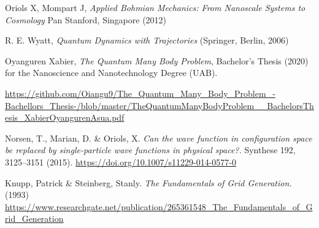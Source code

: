 \documentclass[11pt, a4paper]{article} %
\begin{document}
\begin{thebibliography}{1}

	Oriols X, Mompart J, {\em Applied Bohmian Mechanics: From Nanoscale Systems to Cosmology} Pan Stanford, Singapore (2012)
	

R. E. Wyatt, {\em Quantum Dynamics with Trajectories} (Springer, Berlin, 2006)


	Oyanguren Xabier, {\em The Quantum Many Body Problem}, Bachelor's Thesis (2020) for the Nanoscience and Nanotechnology Degree (UAB).

\href{https://github.com/Oiangu9/The\_Quantum\_Many\_Body\_Problem\_-Bachellors\_Thesis-/blob/master/TheQuantumManyBodyProblem\_\_BachelorsThesis\_XabierOyangurenAsua.pdf}{https://github.com/Oiangu9/The\_Quantum\_Many\_Body\_Problem\_-Bachellors\_Thesis-/blob/master/TheQuantumManyBodyProblem\_\_BachelorsThesis\_XabierOyangurenAsua.pdf}

Norsen, T., Marian, D. \& Oriols, X. {\em Can the wave function in configuration space be replaced by single-particle wave functions in physical space?.} Synthese 192, 3125–3151 (2015). \href{https://doi.org/10.1007/s11229-014-0577-0}{https://doi.org/10.1007/s11229-014-0577-0}


Knupp, Patrick \& Steinberg, Stanly. {\em The Fundamentals of Grid Generation.} (1993) \href{https://www.researchgate.net/publication/265361548_The_Fundamentals_of_Grid_Generation}{https://www.researchgate.net/publication/265361548\_The\_Fundamentals\_of\_Grid\_Generation} 


	
\end{thebibliography}
\end{document}
